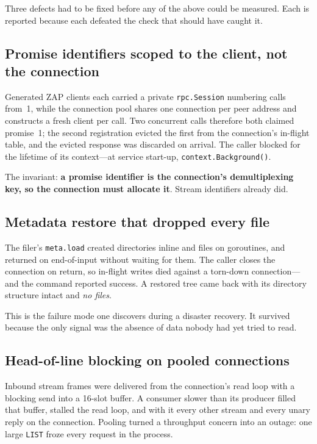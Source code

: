 \documentclass[11pt]{article}
\begin{document}
Three defects had to be fixed before any of the above could be measured.
Each is reported because each defeated the check that should have caught it.

\subsection{Promise identifiers scoped to the client, not the connection}

Generated ZAP clients each carried a private \texttt{rpc.Session} numbering
calls from~1, while the connection pool shares one connection per peer
address and constructs a fresh client per call. Two concurrent calls
therefore both claimed promise~1; the second registration evicted the first
from the connection's in-flight table, and the evicted response was discarded
on arrival. The caller blocked for the lifetime of its context---at service
start-up, \texttt{context.Background()}.

The invariant: \textbf{a promise identifier is the connection's
demultiplexing key, so the connection must allocate it}. Stream identifiers
already did.

\subsection{Metadata restore that dropped every file}

The filer's \texttt{meta.load} created directories inline and files on
goroutines, and returned on end-of-input without waiting for them. The caller
closes the connection on return, so in-flight writes died against a torn-down
connection---and the command reported success. A restored tree came back with
its directory structure intact and \emph{no files}.

This is the failure mode one discovers during a disaster recovery. It
survived because the only signal was the absence of data nobody had yet
tried to read.

\subsection{Head-of-line blocking on pooled connections}
\label{sec:hol}

Inbound stream frames were delivered from the connection's read loop with a
blocking send into a 16-slot buffer. A consumer slower than its producer
filled that buffer, stalled the read loop, and with it every other stream and
every unary reply on the connection. Pooling turned a throughput concern into
an outage: one large \texttt{LIST} froze every request in the process.
\end{document}
